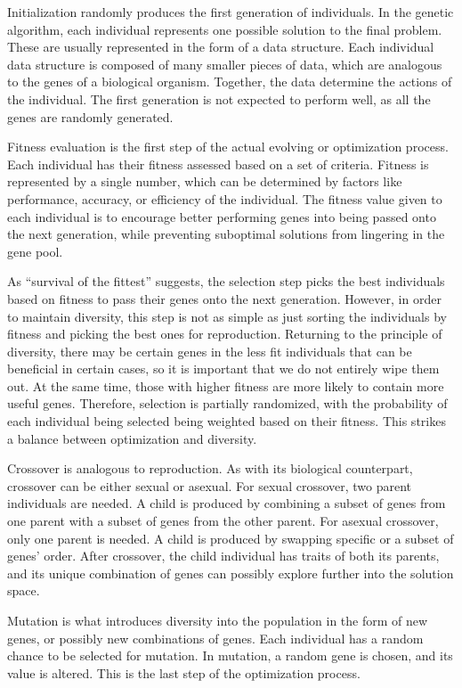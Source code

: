 \documentclass[12pt]{article}
\begin{document}
Initialization randomly produces the first generation of individuals. In the genetic algorithm, each individual represents one possible solution to the final problem. These are usually represented in the form of a data structure. Each individual data structure is composed of many smaller pieces of data, which are analogous to the genes of a biological organism. Together, the data determine the actions of the individual. The first generation is not expected to perform well, as all the genes are randomly generated.

Fitness evaluation is the first step of the actual evolving or optimization process. Each individual has their fitness assessed based on a set of criteria. Fitness is represented by a single number, which can be determined by factors like performance, accuracy, or efficiency of the individual. The fitness value given to each individual is to encourage better performing genes into being passed onto the next generation, while preventing suboptimal solutions from lingering in the gene pool.

As ``survival of the fittest'' suggests, the selection step picks the best individuals based on fitness to pass their genes onto the next generation. However, in order to maintain diversity, this step is not as simple as just sorting the individuals by fitness and picking the best ones for reproduction. Returning to the principle of diversity, there may be certain genes in the less fit individuals that can be beneficial in certain cases, so it is important that we do not entirely wipe them out. At the same time, those with higher fitness are more likely to contain more useful genes. Therefore, selection is partially randomized, with the probability of each individual being selected being weighted based on their fitness. This strikes a balance between optimization and diversity.

Crossover is analogous to reproduction. As with its biological counterpart, crossover can be either sexual or asexual. For sexual crossover, two parent individuals are needed. A child is produced by combining a subset of genes from one parent with a subset of genes from the other parent. For asexual crossover, only one parent is needed. A child is produced by swapping specific or a subset of genes' order. After crossover, the child individual has traits of both its parents, and its unique combination of genes can possibly explore further into the solution space.

Mutation is what introduces diversity into the population in the form of new genes, or possibly new combinations of genes. Each individual has a random chance to be selected for mutation. In mutation, a random gene is chosen, and its value is altered. This is the last step of the optimization process.
\end{document}
